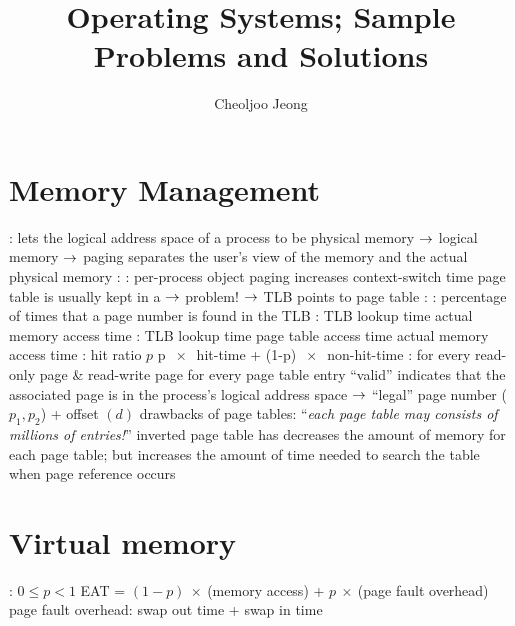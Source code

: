 \documentclass{myart}
\begin{document}
\title{\large\bf Operating Systems; Sample Problems and Solutions}
\author{\normalsize Cheoljoo Jeong}
\date{}
\maketitle

\section{Memory Management}
\bit
\w {}: lets the logical address space of a process to be
	\bit
	\w physical memory $\mbox{$\rightarrow$}$ 
	\w logical memory $\mbox{$\rightarrow$}$ 
	\w {}
	\eit
\w paging separates the user's view of the memory and the actual physical
	memory
\w {}: 
\w {}: per-process object
	\bit
	\w paging increases context-switch time
	\w page table is usually kept in a  $\mbox{$\rightarrow$}$ problem!
		$\mbox{$\rightarrow$}$ TLB
	\w {} points to page table
	\eit
\w {}: 
\w {}: percentage of times that a page number is found
	in the TLB
	\bit
	\w {}: 
		\ben	
		\w TLB lookup time
		\w actual memory access time
		\een
	\w {}:
		\ben
		\w TLB lookup time
		\w page table access time
		\w actual memory access time	
		\een
	\eit
\w {}: hit ratio $p$
	\bit
	\w p $\ \times\ $ hit-time + (1-p) $\ \times\ $ non-hit-time
	\eit
\w {}:
	\bit
	\w {} for every 
		\bit
		\w read-only page \& read-write page
		\eit
	\w {} for every page table entry
		\bit
		\w ``valid'' indicates that the associated page is in the 
		process's logical address space $\mbox{$\rightarrow$}$ ``legal''
		\eit
	\eit
\w {}
	\bit
	\w page number ($p_1, p_2$) + offset $(d)$
	\eit
\w {}
	\bit
	\w drawbacks of page tables:
	``{\em{}each page table may consists of millions of entries!\/}''
	\w inverted page table has 
	\w decreases the amount of memory for each page table;
	but increases the amount of time needed to search the table
	when page reference occurs
	\eit
\eit


\section{Virtual memory}
\bit
\w {}
	\bit
	\w {}: $0 \le p < 1$
	\w EAT = $(1 - p)\ \times\ $(memory access) + 
		$p\ \times\ $(page fault overhead)
	\w page fault overhead: swap out time + swap in time
	\eit
	
\end{document}
